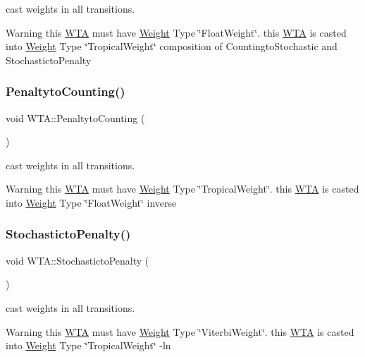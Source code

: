 cast weights in all transitions. 

\begin{DoxyWarning}{Warning}
this \mbox{\hyperlink{classWTA}{W\+TA}} must have \mbox{\hyperlink{classWeight}{Weight}} Type \char`\"{}\+Float\+Weight\char`\"{}. this \mbox{\hyperlink{classWTA}{W\+TA}} is casted into \mbox{\hyperlink{classWeight}{Weight}} Type \char`\"{}\+Tropical\+Weight\char`\"{} composition of Countingto\+Stochastic and Stochasticto\+Penalty 
\end{DoxyWarning}
\mbox{\label{group__schemata_gaff1196a45ffd1400bc4004e27b167218}} 
\subsubsection{\texorpdfstring{PenaltytoCounting()}{PenaltytoCounting()}}
{\footnotesize\ttfamily void W\+T\+A\+::\+Penaltyto\+Counting (\begin{DoxyParamCaption}{ }\end{DoxyParamCaption})}



cast weights in all transitions. 

\begin{DoxyWarning}{Warning}
this \mbox{\hyperlink{classWTA}{W\+TA}} must have \mbox{\hyperlink{classWeight}{Weight}} Type \char`\"{}\+Tropical\+Weight\char`\"{}. this \mbox{\hyperlink{classWTA}{W\+TA}} is casted into \mbox{\hyperlink{classWeight}{Weight}} Type \char`\"{}\+Float\+Weight\char`\"{} inverse 
\end{DoxyWarning}
\mbox{\label{group__schemata_ga0bddc6750b18023be6976bd5cd46a2f5}} 
\subsubsection{\texorpdfstring{StochastictoPenalty()}{StochastictoPenalty()}}
{\footnotesize\ttfamily void W\+T\+A\+::\+Stochasticto\+Penalty (\begin{DoxyParamCaption}{ }\end{DoxyParamCaption})}



cast weights in all transitions. 

\begin{DoxyWarning}{Warning}
this \mbox{\hyperlink{classWTA}{W\+TA}} must have \mbox{\hyperlink{classWeight}{Weight}} Type \char`\"{}\+Viterbi\+Weight\char`\"{}. this \mbox{\hyperlink{classWTA}{W\+TA}} is casted into \mbox{\hyperlink{classWeight}{Weight}} Type \char`\"{}\+Tropical\+Weight\char`\"{} -\/ln 
\end{DoxyWarning}
